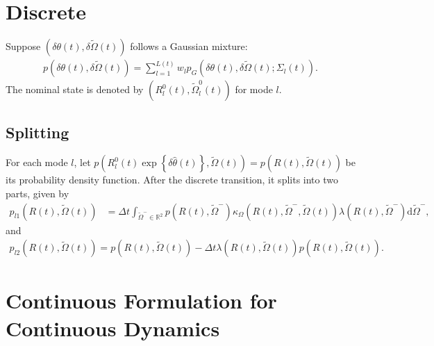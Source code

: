 \documentclass[10pt]{article}
\newcommand{\diff}[1]{\mathrm{d}#1}
\newcommand{\expb}[1]{\ensuremath{\exp\left\{ #1 \right\}}}
\begin{document}
\section{Discrete}

Suppose $(\delta\theta(t), \delta\tilde{\Omega}(t))$ follows a Gaussian mixture:
\begin{align}
	p\left(\delta\theta(t), \delta\tilde{\Omega}(t)\right) = \sum_{l=1}^{L(t)} w_l p_G\left(\delta\theta(t), \delta\tilde{\Omega}(t); \Sigma_{l}(t)\right).
\end{align}
The nominal state is denoted by $(R_l^0(t), \tilde{\Omega}_l^0(t))$ for mode $l$.

\subsection{Splitting}

For each mode $l$, let $p\left( R_l^0(t)\expb{\delta\hat{\theta}(t)}, \tilde{\Omega}(t) \right) = p\left(R(t),\tilde{\Omega}(t)\right)$ be its probability density function. After the discrete transition, it splits into two parts, given by
\begin{align*}
	p_{l1}\left( R(t),\tilde{\Omega}(t) \right) &= \Delta t \int_{\tilde{\Omega}^- \in \mathbb{R}^2} p\left( R(t), \tilde{\Omega}^- \right) \kappa_\Omega\left( R(t), \tilde{\Omega}^-, \tilde{\Omega}(t) \right) \lambda\left( R(t), \tilde{\Omega}^- \right) \diff{\tilde{\Omega}^-},
\end{align*}
and
\begin{align*}
	p_{l2}\left(R(t),\tilde{\Omega}(t)\right) = p\left(R(t),\tilde{\Omega}(t)\right) - \Delta t \lambda\left(R(t),\tilde{\Omega}(t)\right) p\left(R(t),\tilde{\Omega}(t)\right).
\end{align*}

\section{Continuous Formulation for Continuous Dynamics}
\end{document}
